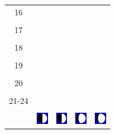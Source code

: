 \documentclass[twoside, a4paper,12pt, tikz]{scrartcl}
\begin{document}
\begin{tabularx}{\linewidth}{|c|X|X|p{2cm}|p{2cm}|}
            &   &       &    &   \\
          \hline
          16&   &                 &    &   \\
            &   &       &    &   \\
          \hline
          17&   &                 &    &   \\
            &   &       &    &   \\
          \hline
          18&   &                 &    &   \\
            &   &       &    &   \\
          \hline
          19&   &                 &     &   \\
            &   &       &    &   \\
          \hline
          20&   &              &    &   \\
            &   &       &    &   \\
          \hline 
          21-24&   &              &    &   \\
            &   &       &    &   \\
          \hline
                      & \vspace{0.01cm} \centerline{\includegraphics[width=0.5cm]{moon_phases/Moon_phase_2.svg.png}} \vspace{0.1cm} & \vspace{0.01cm} \centerline{\includegraphics[width=0.5cm]{moon_phases/Moon_phase_2.svg.png}} \vspace{0.1cm} & \vspace{0.01cm} \centerline{\includegraphics[width=0.5cm]{moon_phases/Moon_phase_3.svg.png}} \vspace{0.1cm} & \vspace{0.01cm} \centerline{\includegraphics[width=0.5cm]{moon_phases/Moon_phase_3.svg.png}} \vspace{0.1cm}\\
          \hline    
        \end{tabularx}
\end{document}
